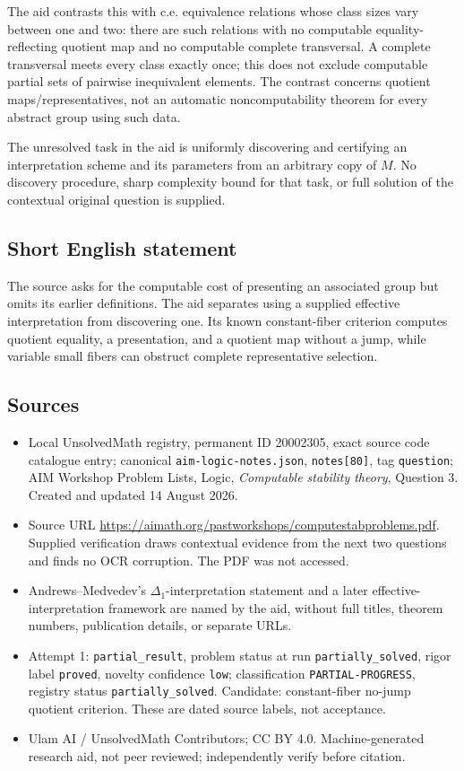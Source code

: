 \documentclass[11pt]{article}
\begin{document}
The aid contrasts this with c.e. equivalence relations whose class sizes vary between one and two: there are such relations with no computable equality-reflecting quotient map and no computable complete transversal. A complete transversal meets every class exactly once; this does not exclude computable partial sets of pairwise inequivalent elements. The contrast concerns quotient maps/representatives, not an automatic noncomputability theorem for every abstract group using such data.

The unresolved task in the aid is uniformly discovering and certifying an interpretation scheme and its parameters from an arbitrary copy of \(M\). No discovery procedure, sharp complexity bound for that task, or full solution of the contextual original question is supplied.
\subsection{Short English statement}
The source asks for the computable cost of presenting an associated group but omits its earlier definitions. The aid separates using a supplied effective interpretation from discovering one. Its known constant-fiber criterion computes quotient equality, a presentation, and a quotient map without a jump, while variable small fibers can obstruct complete representative selection.
\subsection{Sources}
\begin{itemize}
\item Local UnsolvedMath registry, permanent ID 20002305, exact source code catalogue entry; canonical \texttt{aim-logic-notes.json}, \texttt{notes[80]}, tag \texttt{question}; AIM Workshop Problem Lists, Logic, \emph{Computable stability theory}, Question 3. Created and updated 14 August 2026.
\item Source URL \url{https://aimath.org/pastworkshops/computestabproblems.pdf}. Supplied verification draws contextual evidence from the next two questions and finds no OCR corruption. The PDF was not accessed.
\item Andrews--Medvedev's \(\Delta_1\)-interpretation statement and a later effective-interpretation framework are named by the aid, without full titles, theorem numbers, publication details, or separate URLs.
\item Attempt 1: \texttt{partial\_result}, problem status at run \texttt{partially\_solved}, rigor label \texttt{proved}, novelty confidence \texttt{low}; classification \texttt{PARTIAL-PROGRESS}, registry status \texttt{partially\_solved}. Candidate: constant-fiber no-jump quotient criterion. These are dated source labels, not acceptance.
\item Ulam AI / UnsolvedMath Contributors; CC BY 4.0. Machine-generated research aid, not peer reviewed; independently verify before citation.
\end{itemize}
\end{document}
